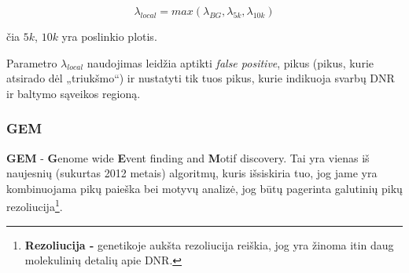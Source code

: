 \documentclass[12pt]{article}
\begin{document}
\begin{equation} \label{lambda_local}
    \lambda_{local} = max(\lambda_{BG}, \lambda_{5k}, \lambda_{10k})
\end{equation}

čia \(5k\), \(10k\) yra poslinkio plotis.

Parametro \(\lambda_{local}\) naudojimas leidžia aptikti \emph{false positive},
pikus (pikus, kurie atsirado dėl „triukšmo“) ir nustatyti tik tuos pikus,
kurie indikuoja svarbų DNR ir baltymo sąveikos regioną\cite{ARTICLE12}.
  
\subsubsection{GEM}
\textbf{GEM} - \textbf{G}enome wide \textbf{E}vent finding and \textbf{M}otif
discovery. Tai yra vienas iš naujesnių (sukurtas 2012 metais) algoritmų, kuris
išsiskiria tuo, jog jame yra kombinuojama pikų paieška bei motyvų analizė, jog
būtų pagerinta galutinių pikų rezoliucija\footnote{\textbf{Rezoliucija - }
genetikoje aukšta rezoliucija reiškia, jog yra žinoma itin daug molekulinių
detalių apie DNR.}.\\
\end{document}
